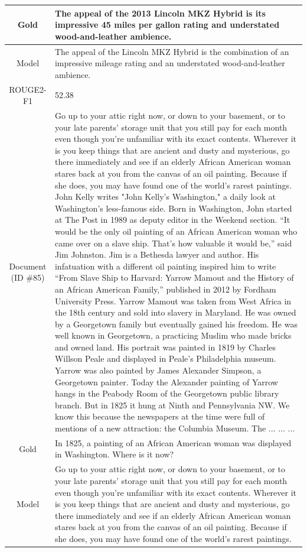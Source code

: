 \begin{table}[bth!]
\begin{tabular}{c|p{}}
\\ \hline
Gold & 
The appeal of the 2013 Lincoln MKZ Hybrid is its impressive 45 miles per gallon rating and understated wood-and-leather ambience.
\\ \hline
Model & 
The appeal of the Lincoln MKZ Hybrid is the combination of an impressive mileage rating and an understated wood-and-leather ambience.
\\ \hline
ROUGE2-F1 & 
52.38
\\ \hline
\makecell{Document\\(ID \#85)} & 
Go up to your attic right now, or down to your basement, or to your late parents’ storage unit that you still pay for each month even though you’re unfamiliar with its exact contents. Wherever it is you keep things that are ancient and dusty and mysterious, go there immediately and see if an elderly African American woman stares back at you from the canvas of an oil painting. Because if she does, you may have found one of the world’s rarest paintings. John Kelly writes "John Kelly's Washington," a daily look at Washington's less-famous side. Born in Washington, John started at The Post in 1989 as deputy editor in the Weekend section. “It would be the only oil painting of an African American woman who came over on a slave ship. That’s how valuable it would be,” said Jim Johnston. Jim is a Bethesda lawyer and author. His infatuation with a different oil painting inspired him to write “From Slave Ship to Harvard: Yarrow Mamout and the History of an African American Family,” published in 2012 by Fordham University Press. Yarrow Mamout was taken from West Africa in the 18th century and sold into slavery in Maryland. He was owned by a Georgetown family but eventually gained his freedom. He was well known in Georgetown, a practicing Muslim who made bricks and owned land. His portrait was painted in 1819 by Charles Willson Peale and displayed in Peale’s Philadelphia museum. Yarrow was also painted by James Alexander Simpson, a Georgetown painter. Today the Alexander painting of Yarrow hangs in the Peabody Room of the Georgetown public library branch. But in 1825 it hung at Ninth and Pennsylvania NW. We know this because the newspapers at the time were full of mentions of a new attraction: the Columbia Museum. The ... ... ... 
\\ \hline
Gold & 
In 1825, a painting of an African American woman was displayed in Washington. Where is it now?
\\ \hline
Model & 
Go up to your attic right now, or down to your basement, or to your late parents’ storage unit that you still pay for each month even though you’re unfamiliar with its exact contents. Wherever it is you keep things that are ancient and dusty and mysterious, go there immediately and see if an elderly African American woman stares back at you from the canvas of an oil painting. Because if she does, you may have found one of the world’s rarest paintings.

\end{tabular}
\end{table}
